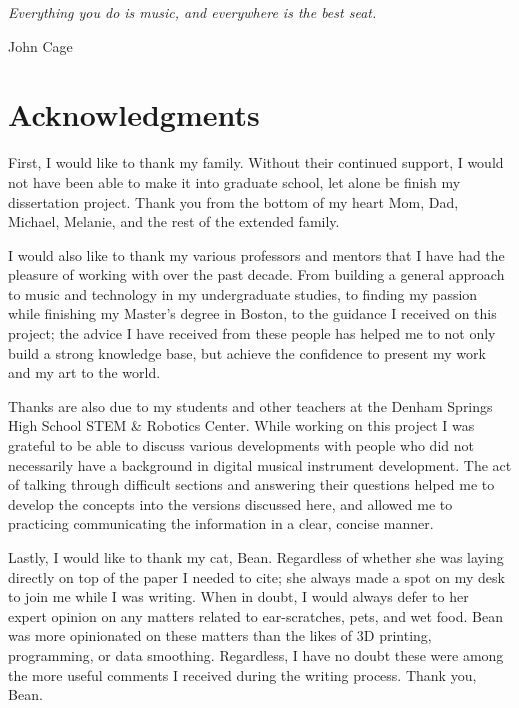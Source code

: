 \begin{centeredpage}
\epigraph{\textit{Everything you do is music, and everywhere is the best seat.}}{John Cage}
\end{centeredpage}


\chapter{Acknowledgments}

First, I would like to thank my family. Without their continued support, I would not have been able to make it into graduate school, let alone be finish my dissertation project. Thank you from the bottom of my heart Mom, Dad, Michael, Melanie, and the rest of the extended family. 

I would also like to thank my various professors and mentors that I have had the pleasure of working with over the past decade. From building a general approach to music and technology in my undergraduate studies, to finding my passion while finishing my Master’s degree in Boston, to the guidance I received on this project; the advice I have received from these people has helped me to not only build a strong knowledge base, but achieve the confidence to present my work and my art to the world. %

Thanks are also due to my students and other teachers at the Denham Springs High School STEM \& Robotics Center. While working on this project I was grateful to be able to discuss various developments with people who did not necessarily have a background in digital musical instrument development. The act of talking through difficult sections and answering their questions helped me to develop the concepts into the versions discussed here, and allowed me to practicing communicating the information in a clear, concise manner. %

Lastly, I would like to thank my cat, Bean. Regardless of whether she was laying directly on top of the paper I needed to cite; she always made a spot on my desk to join me while I was writing. When in doubt, I would always defer to her expert opinion on any matters related to ear-scratches, pets, and wet food. Bean was more opinionated on these matters than the likes of 3D printing, programming, or data smoothing. Regardless, I have no doubt these were among the more useful comments I received during the writing process. Thank you, Bean.

